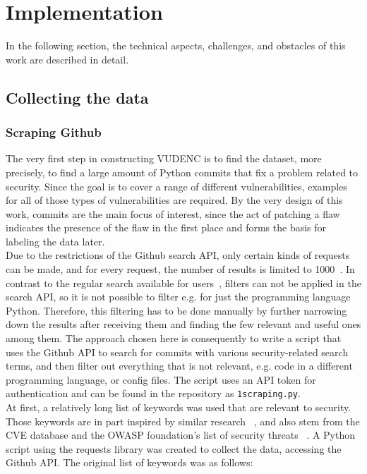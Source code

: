 \documentclass[
a4paper,
pagesize,
pdftex,
12pt,
twoside, %
BCOR=5mm, %
ngerman,
fleqn,
final,
]{scrartcl}
\begin{document}
	
	
	\newpage
	\section{Implementation}
	In the following section, the technical aspects, challenges, and obstacles of this work are described in detail.
	
	\subsection{Collecting the data}
	\subsubsection{Scraping Github}
	The very first step in constructing VUDENC is to find the dataset, more precisely, to find a large amount of Python commits that fix a problem related to security. Since the goal is to cover a range of different vulnerabilities, examples for all of those types of vulnerabilities are required. By the very design of this work, commits are the main focus of interest, since the act of patching a flaw indicates the presence of the flaw in the first place and forms the basis for labeling the data later.\\	
	Due to the restrictions of the Github search API, only certain kinds of requests can be made, and for every request, the number of results is limited to 1000~\cite{Github.com.2}. In contrast to the regular search available for users~\cite{Github.com.2019}, filters can not be applied in the search API, so it is not possible to filter e.g. for just the programming language Python. Therefore, this filtering has to be done manually by further narrowing down the results after receiving them and finding the few relevant and useful ones among them.
	The approach chosen here is consequently to write a script that uses the Github API to search for commits with various security-related search terms, and then filter out everything that is not relevant, e.g. code in a different programming language, or config files. The script uses an API token for authentication and can be found in the repository as \texttt{1scraping.py}.\\
	At first, a relatively long list of keywords was used that are relevant to security. Those keywords are in part inspired by similar research ~\cite{Zhou.2017}, and also stem from the CVE database \cite{CVE} and the OWASP foundation's list of security threats ~\cite{OWASPFoundation.}. A Python script using the requests library was created to collect the data, accessing the Github API. The original list of keywords was as follows:
\end{document}
